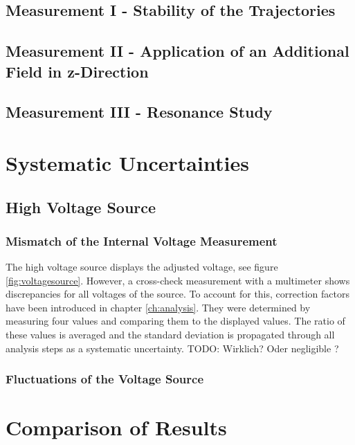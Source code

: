 \documentclass[
	paper=A4,
	parskip=full,
	chapterprefix=true,
	11pt,
	headings=normal,
	bibliography=totoc,
	listof=totoc,
	titlepage=on,
]{scrreprt}
\begin{document}
\section{Measurement I - Stability of the Trajectories}
\section{Measurement II - Application of an Additional Field in z-Direction}
\section{Measurement III - Resonance Study}

\chapter{Systematic Uncertainties}
\label{ch:systematics}
\section{High Voltage Source}
\subsection{Mismatch of the Internal Voltage Measurement}
The high voltage source displays the adjusted voltage, see figure \ref{fig:voltagesource}. However, a cross-check measurement with a multimeter shows discrepancies for all voltages of the source. To account for this, correction factors have been introduced in chapter \ref{ch:analysis}. They were determined by measuring four values and comparing them to the displayed values. The ratio of these values is averaged and the standard deviation is propagated through all analysis steps as a systematic uncertainty. TODO: Wirklich? Oder negligible ? 
\subsection{Fluctuations of the Voltage Source}

\chapter{Comparison of Results}


\cleardoublepage


{}
\end{document}
